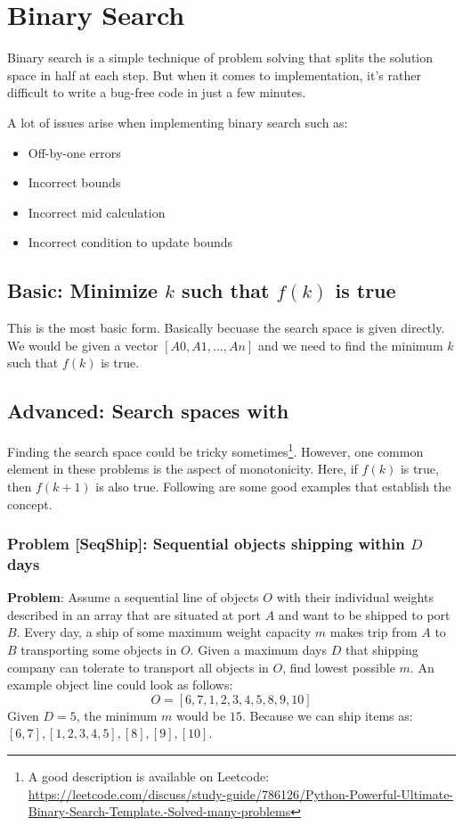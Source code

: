 \chapter{Binary Search}
Binary search is a simple technique of problem solving that splits the solution space in half at each step. But when it comes to implementation, it's rather difficult to write a bug-free code in just a few minutes.

A lot of issues arise when implementing binary search such as:
\begin{itemize}
    \item Off-by-one errors
    \item Incorrect bounds
    \item Incorrect mid calculation
    \item Incorrect condition to update bounds
\end{itemize}

\section{Basic: Minimize $k$ such that $f(k)$ is true}
This is the most basic form. Basically becuase the search space is given directly. We would be given a vector $[A0, A1, ..., An]$ and we need to find the minimum $k$ such that $f(k)$ is true.

\section{Advanced: Search spaces with }
Finding the search space could be tricky sometimes\footnote{A good description is available on Leetcode: \href{https://leetcode.com/discuss/study-guide/786126/Python-Powerful-Ultimate-Binary-Search-Template.-Solved-many-problems}{https://leetcode.com/discuss/study-guide/786126/Python-Powerful-Ultimate-Binary-Search-Template.-Solved-many-problems}}. However, one common element in these problems is the aspect of monotonicity. Here, if $f(k)$ is true, then $f(k+1)$ is also true. Following are some good examples that establish the concept.

\subsection{Problem [SeqShip]: Sequential objects shipping within $D$ days}
\textbf{Problem}: Assume a sequential line of objects $O$ with their individual weights described in an array that are situated at port $A$ and want to be shipped to port $B$. Every day, a ship of some maximum weight capacity $m$ makes trip from $A$ to $B$ transporting some objects in $O$. Given a maximum days $D$ that shipping company can tolerate to transport all objects in $O$, find lowest possible $m$. An example object line could look as follows:
$$
O = [6, 7, 1, 2, 3, 4, 5, 8, 9, 10]
$$
Given $D = 5$, the minimum $m$ would be $15$. Because we can ship items as: $[6, 7], [1, 2, 3, 4, 5], [8], [9], [10]$.

